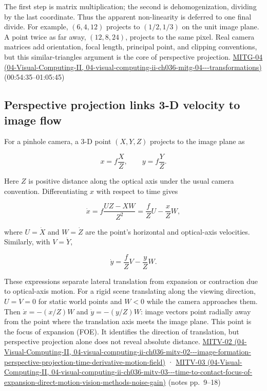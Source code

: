 The first step is matrix multiplication; the second is dehomogenization, dividing by the last coordinate. Thus the apparent non-linearity is deferred to one final divide. For example, \((6,4,12)\) projects to \((1/2,1/3)\) on the unit image plane. A point twice as far away, \((12,8,24)\), projects to the same pixel. Real camera matrices add orientation, focal length, principal point, and clipping conventions, but this similar-triangles argument is the core of perspective projection. \href{../04-Visual-Computing-II/main.pdf\#nameddest=04-visual-computing-ii-ch036-mitg-04---transformations}{MITG-04 (04-Visual-Computing-II, 04-visual-computing-ii-ch036-mitg-04-\/-\/-transformations)} (00:54:35--01:05:45)

\subsection{Perspective projection links 3-D velocity to image flow}\label{03-visual-computing-i-ch003-perspective-projection-links-3-d-velocity-to-image-flow}

For a pinhole camera, a 3-D point \((X,Y,Z)\) projects to the image plane as

\[
x=f\frac{X}{Z},\qquad y=f\frac{Y}{Z}.
\]

Here \(Z\) is positive distance along the optical axis under the usual camera convention. Differentiating \(x\) with respect to time gives

\[
\dot{x}=f\frac{U Z-XW}{Z^2}=\frac{f}{Z}U-\frac{x}{Z}W,
\]

where \(U=\dot X\) and \(W=\dot Z\) are the point's horizontal and optical-axis velocities. Similarly, with \(V=\dot Y\),

\[
\dot{y}=\frac{f}{Z}V-\frac{y}{Z}W.
\]

These expressions separate lateral translation from expansion or contraction due to optical-axis motion. For a rigid scene translating along the viewing direction, \(U=V=0\) for static world points and \(W<0\) while the camera approaches them. Then \(\dot{x}=-(x/Z)W\) and \(\dot{y}=-(y/Z)W\): image vectors point radially away from the point where the translation axis meets the image plane. This point is the focus of expansion (FOE). It identifies the direction of translation, but perspective projection alone does not reveal absolute distance. \href{../04-Visual-Computing-II/main.pdf\#nameddest=04-visual-computing-ii-ch036-mitv-02---image-formation-perspective-projection-time-derivative-motion-field}{MITV-02 (04-Visual-Computing-II, 04-visual-computing-ii-ch036-mitv-02-\/-\/-image-formation-perspective-projection-time-derivative-motion-field)} · \href{../04-Visual-Computing-II/main.pdf\#nameddest=04-visual-computing-ii-ch036-mitv-03---time-to-contact-focus-of-expansion-direct-motion-vision-methods-noise-gain}{MITV-03 (04-Visual-Computing-II, 04-visual-computing-ii-ch036-mitv-03-\/-\/-time-to-contact-focus-of-expansion-direct-motion-vision-methods-noise-gain)} (notes pp.~9--18)

